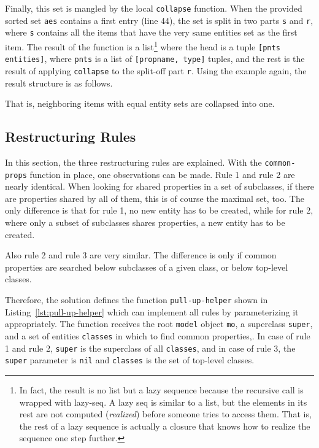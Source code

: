 \documentclass[11pt]{article}
\begin{document}
Finally, this set is mangled by the local \verb|collapse| function.  When the
provided sorted set \verb|aes| contains a first entry (line 44), the set is
split in two parts \verb|s| and \verb|r|, where \verb|s| contains all the items
that have the very same entities set as the first item.  The result of the
function is a list\footnote{In fact, the result is no list but a lazy sequence
  because the recursive call is wrapped with \textsf{lazy-seq}.  A lazy seq is
  similar to a list, but the elements in its rest are not computed
  (\emph{realized}) before someone tries to access them.  That is, the rest of
  a lazy sequence is actually a closure that knows how to realize the sequence
  one step further.}  where the head is a tuple \verb|[pnts entities]|, where
\verb|pnts| is a list of \verb|[propname, type]| tuples, and the rest is the
result of applying \verb|collapse| to the split-off part \verb|r|.  Using the
example again, the result structure is as follows.

\begin{clojurecode*}{linenos=none}
([([pn2 t2])          #{e2 e3 e4 e5}]
 [([pn1 t1] [pn3 t2]) #{e1 e2 e3}]
 [([pn4 t2])          #{e2 e3 e4}]}
\end{clojurecode*}

That is, neighboring items with equal entity sets are collapsed into one.


\subsection{Restructuring Rules}
\label{sec:restructuring-rules}

In this section, the three restructuring rules are explained.  With the
\verb|common-props| function in place, one observations can be made.  Rule 1
and rule 2 are nearly identical.  When looking for shared properties in a set
of subclasses, if there are properties shared by all of them, this is of course
the maximal set, too.  The only difference is that for rule 1, no new entity
has to be created, while for rule 2, where only a subset of subclasses shares
properties, a new entity has to be created.

Also rule 2 and rule 3 are very similar.  The difference is only if common
properties are searched below subclasses of a given class, or below top-level
classes.

Therefore, the solution defines the function \verb|pull-up-helper| shown in
Listing~\ref{lst:pull-up-helper} which can implement all rules by
parameterizing it appropriately.  The function receives the root \verb|model|
object \verb|mo|, a superclass \verb|super|, and a set of entities
\verb|classes| in which to find common properties,.  In case of rule 1 and rule
2, \verb|super| is the superclass of all \verb|classes|, and in case of rule 3,
the \verb|super| parameter is \verb|nil| and \verb|classes| is the set of
top-level classes.
\end{document}
